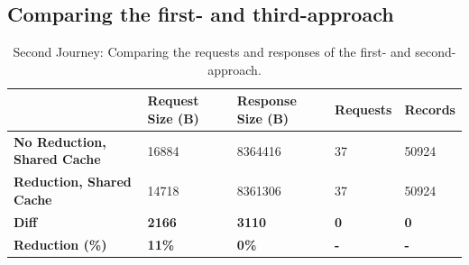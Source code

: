 \subsection{Comparing the first- and third-approach}\label{subsection:results:comparison-second-path-first-third-approach}

\ifshowTables
\begin{table}[H]
\begin{tabular}{|l|l|l|l|l|}
  \hline
  & \textbf{Request Size (B)} & \textbf{Response Size (B)} & \textbf{Requests} & \textbf{Records} \\
  \hline
  \textbf{No Reduction, Shared Cache} & 16884 & 8364416 & 37 & 50924 \\
  \hline
  \textbf{Reduction, Shared Cache} & 14718 & 8361306 & 37 & 50924 \\
  \hline
  \hline
  \textbf{Diff} & \textbf{2166} & \textbf{3110} & \textbf{0} & \textbf{0} \\
  \hline
  \textbf{Reduction (\%)} & \textbf{11\%} & \textbf{0\%} & \textbf{-} & \textbf{-} \\
  \hline
  \end{tabular}
  \caption{Second Journey: Comparing the requests and responses of the first- and second-approach.}\label{table:results:size-comparison-second-path-no-cache-no-reduction-cache-no-reduction}
\end{table}
\fi